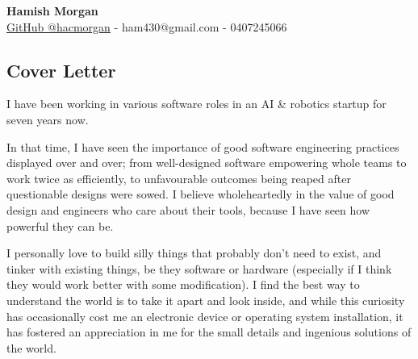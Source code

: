 \documentclass[12pt]{article}
\begin{document}
\begin{center}
  \Large
  \vspace{0.8cm}
  \textbf{Hamish Morgan}\\
  \vspace{0.8cm}
  \large
  \href{https://github.com/hacmorgan}{GitHub @hacmorgan} - ham430@gmail.com - 0407245066

\end{center}


\begin{FlushLeft}

  \section*{Cover Letter}

  I have been working in various software roles in an AI \& robotics startup for seven years now. \\

  \vspace{0.3cm}
  
  In that time, I have seen the importance of good software engineering practices displayed over and over; from well-designed software empowering whole teams to work twice as efficiently, to unfavourable outcomes being reaped after questionable designs were sowed. I believe wholeheartedly in the value of good design and engineers who care about their tools, because I have seen how powerful they can be. \\

  \vspace{0.3cm}

  I personally love to build silly things that probably don't need to exist, and tinker with existing things, be they software or hardware (especially if I think they would work better with some modification). I find the best way to understand the world is to take it apart and look inside, and while this curiosity has occasionally cost me an electronic device or operating system installation, it has fostered an appreciation in me for the small details and ingenious solutions of the world.

\end{FlushLeft}
\end{document}
